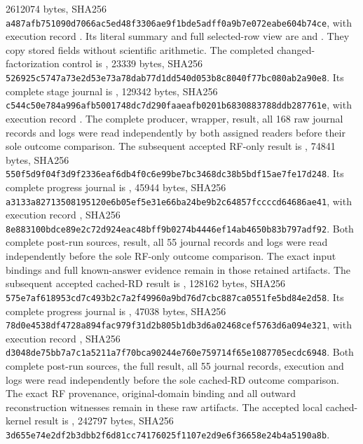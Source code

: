 \documentclass[10pt]{article}
\begin{document}
2612074 bytes, SHA256
\texttt{a487afb751090d7066ac5ed48f3306ae9f1bde5adff0a9b7e072eabe604b74ce},
with execution record
.
Its literal summary and full selected-row view are
and
.
They copy stored fields without scientific arithmetic.
The completed changed-factorization control is
,
23339 bytes, SHA256
\texttt{526925c5747a73e2d53e73a78dab77d1dd540d053b8c8040f77bc080ab2a90e8}.
Its complete stage journal is
,
129342 bytes, SHA256
\texttt{c544c50e784a996afb5001748dc7d290faaeafb0201b6830883788ddb287761e},
with execution record
.
The complete producer, wrapper, result, all 168 raw journal
records and logs were read independently by both assigned
readers before their sole outcome comparison.
The subsequent accepted RF-only result is
,
74841 bytes, SHA256
\texttt{550f5d9f04f3d9f2336eaf6db4f0c6e99be7bc3468dc38b5bdf15ae7fe17d248}.
Its complete progress journal is
,
45944 bytes, SHA256
\texttt{a3133a82713508195120e6b05ef5e31e66ba24be9b2c64857fccccd64686ae41},
with execution record
,
SHA256
\texttt{8e883100bdce89e2c72d924eac48bff9b0274b4446ef14ab4650b83b797adf92}.
Both complete post-run sources, result, all 55 journal
records and logs were read independently before the sole
RF-only outcome comparison. The exact input bindings and
full known-answer evidence remain in those retained artifacts.
The subsequent accepted cached-RD result is
,
128162 bytes, SHA256
\texttt{575e7af618953cd7c493b2c7a2f49960a9bd76d7cbc887ca0551fe5bd84e2d58}.
Its complete progress journal is
,
47038 bytes, SHA256
\texttt{78d0e4538df4728a894fac979f31d2b805b1db3d6a02468cef5763d6a094e321},
with execution record
,
SHA256
\texttt{d3048de75bb7a7c1a5211a7f70bca90244e760e759714f65e1087705ecdc6948}.
Both complete post-run sources, the full result, all 55
journal records, execution and logs were read independently
before the sole cached-RD outcome comparison. The exact
RF provenance, original-domain binding and all outward
reconstruction witnesses remain in these raw artifacts.
The accepted local cached-kernel result is
,
242797 bytes, SHA256
\texttt{3d655e74e2df2b3dbb2f6d81cc74176025f1107e2d9e6f36658e24b4a5190a8b}.
\end{document}
